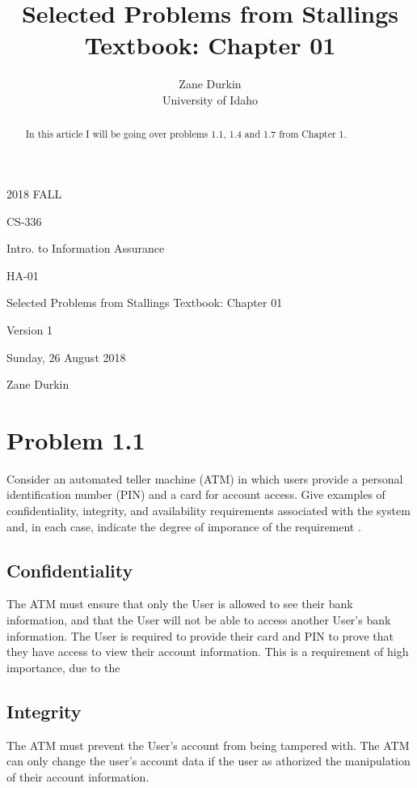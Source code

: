 \documentclass[14pt]{article}
\begin{document}
\title{Selected Problems from Stallings Textbook: Chapter 01}

\author{Zane Durkin\\
    University of Idaho}

\begin{description}[align=left, labelwidth=2cm]
\item [Year and Semester] 2018 FALL
\item [Course Number] CS-336
\item [Course Title] Intro. to Information Assurance
\item [Work Number] HA-01
\item [Work Name] Selected Problems from Stallings Textbook: Chapter 01
\item [Work Version] Version 1
\item [Long Date] Sunday, 26 August 2018
\item [Author(s) Name(s)] Zane Durkin
\end{description}


\begin{abstract}
In this article I will be going over problems 1.1, 1.4 and 1.7 from Chapter 1. 
\end{abstract}

\section{Problem 1.1}
Consider an automated teller machine (ATM) in which users provide a personal identification number (PIN) and a card for account access. Give examples of confidentiality, integrity, and availability requirements associated with the system and, in each case, indicate the degree of imporance of the requirement \cite{stallings}.
\subsection{Confidentiality}
The ATM must ensure that only the User is allowed to see their bank information, and that the User will not be able to access another User's bank information. The User is required to provide their card and PIN to prove that they have access to view their account information. This is a requirement of high importance, due to the 
\subsection{Integrity}
The ATM must prevent the User's account from being tampered with. The ATM can only change the user's account data if the user as athorized the manipulation of their account information.
\end{document}
